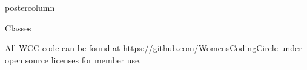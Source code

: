 \documentclass{beamer}
\begin{document}
\begin{frame}
\begin{columns}
\begin{column}{.33\textwidth}
\begin{beamercolorbox}[center,wd=\textwidth]{postercolumn}
\begin{minipage}[T]{.95\textwidth}
{\begin{myblock}{Classes}
\begin{addmargin}[1em]{1em}
\begin{figure}
                                \centering
                                \vspace{.5cm}
                            \end{figure}
                        \end{addmargin}
                        \begin{addmargin}[1em]{1em}
                            All WCC code can be found at https://github.com/WomensCodingCircle under open source licenses for member use. 
                        \end{addmargin}

                    \end{myblock}\vfill
                    
}
\end{minipage}
\end{beamercolorbox}
\end{column}
\end{columns}
\end{frame}
\end{document}
